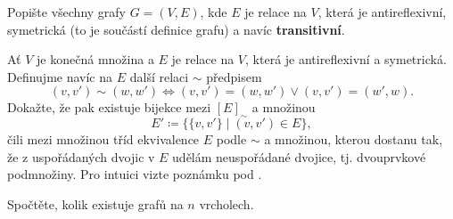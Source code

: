 \begin{exercise}
 Popište všechny grafy $G = (V,E)$, kde $E$ je relace na $V$, která je
 antireflexivní, symetrická (to je součástí definice grafu) a navíc
 \textbf{transitivní}.
\end{exercise}

\begin{exercise}
 Ať $V$ je konečná množina a $E$ je relace na $V$, která je antireflexivní a
 symetrická. Definujme navíc na $E$ další relaci $ \sim $ předpisem
 \[
  (v,v') \sim (w,w') \Leftrightarrow (v,v') = (w,w') \vee (v,v') = (w',w). 
 \]
 Dokažte, že pak existuje bijekce mezi $[E]_{ \sim }$ a množinou
 \[
  E' \coloneqq \{\{v,v'\} \mid (v,v') \in E\},
 \]
 čili mezi množinou tříd ekvivalence $E$ podle $ \sim $ a množinou, kterou
 dostanu tak, že z uspořádaných dvojic v $E$ udělám neuspořádané dvojice, tj.
 dvouprvkové podmnožiny. Pro intuici vizte poznámku pod
 .
\end{exercise}

\begin{exercise}
 Spočtěte, kolik existuje grafů na $n$ vrcholech.
\end{exercise}







